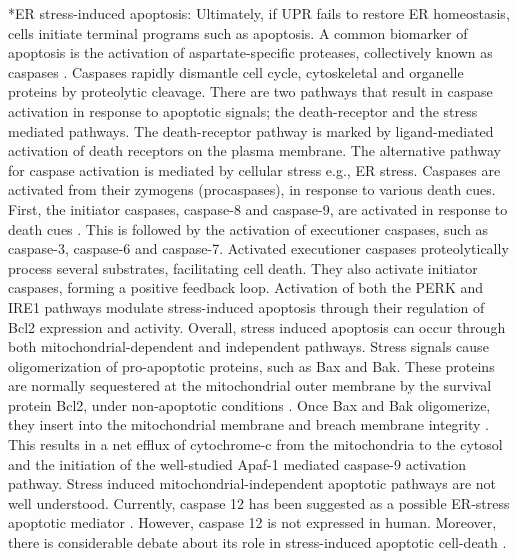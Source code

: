 \documentclass[12pt]{article}
\makeatletter
\renewcommand\subsection{\@startsection
	{subsection}{2}{0mm}
	{-0.05in}
	{-0.5\baselineskip}
	{\normalfont\normalsize\bfseries}}
\makeatother
\begin{document}
\subsection*{ER stress-induced apoptosis:} Ultimately, if UPR fails to restore ER homeostasis, cells initiate terminal programs such as apoptosis. A common biomarker of apoptosis is the activation of aspartate-specific proteases, collectively known as caspases \citep{alnemri1996hic}. Caspases rapidly dismantle cell cycle, cytoskeletal and organelle proteins by proteolytic cleavage. There are two pathways that result in caspase activation in response to apoptotic signals; the death-receptor and the stress mediated pathways. The death-receptor pathway is marked by ligand-mediated activation of death receptors on the plasma membrane. The alternative pathway for caspase activation is mediated by cellular stress e.g., ER stress. Caspases are activated from their zymogens (procaspases), in response to various death cues. First, the initiator caspases, caspase-8 and caspase-9, are activated in response to death cues \citep{muzio1998ipm}. This is followed by the activation of executioner caspases, such as caspase-3, caspase-6 and caspase-7. Activated executioner caspases proteolytically process several substrates, facilitating cell death. They also activate initiator caspases, forming a positive feedback loop. Activation of both the PERK and IRE1 pathways modulate stress-induced apoptosis through their regulation of Bcl2 expression and activity. Overall, stress induced apoptosis can occur through both mitochondrial-dependent and independent pathways. Stress signals cause oligomerization of pro-apoptotic proteins, such as Bax and Bak. These proteins are normally sequestered at the mitochondrial outer membrane by the survival protein Bcl2, under non-apoptotic conditions \citep{wei2001proapoptotic}. Once Bax and Bak oligomerize, they insert into the mitochondrial membrane and breach membrane integrity \citep{nechushtan1999conformation}. This results in a net efflux of cytochrome-c from the mitochondria to the cytosol and the initiation of the well-studied Apaf-1 mediated caspase-9 activation pathway. Stress induced mitochondrial-independent apoptotic pathways are not well understood. Currently, caspase 12 has been suggested as a possible ER-stress apoptotic mediator \citep{szegezdi2006mediators, yoneda2001ace, nakagawa2000caspase}. However, caspase 12 is not expressed in human. Moreover, there is considerable debate about its role in stress-induced apoptotic cell-death \citep{Saleh:2006ys}.  
\end{document}
